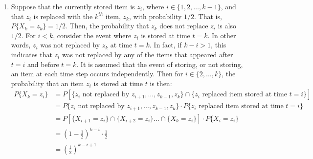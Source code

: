 \documentclass[twoside,11pt]{homework}
\begin{document}
\begin{enumerate}[\bf (a)]
\begin{proof}
Now,  consider the event where any other item $z_i \neq z_{k+1}$ is stored at time $t=k+1$. This is equivalent to the event where item $z_i$ is not replaced with $z_{k+1}$ AND $z_i$ being stored at time $t$. That is, 
\begin{align*}
P \left\lbrace X_{k+1} = z_i ,  \forall i \in \{1, \dots,k\} \right\rbrace & = 
P \left[ \left\lbrace z_i \text{  not replaced with } z_{k+1} \right\rbrace \cap  \left\lbrace z_i \text{ stored at time } t=k  \right\rbrace \right] \\[0.4em] 
& = P \left[ \left\lbrace X_{k+1} = z_i; \ i\neq k+1 \right\rbrace \cap  \left\lbrace X_k = z_i  \right\rbrace \right] \\[0.4em] 
& = P \left\lbrace X_{k+1} = z_i; \ i\neq k+1 \right\rbrace \cdot P \left\lbrace X_k = z_i  \right\rbrace \\[0.4em]
&= \left(1 - \frac{1}{k+1}\right) \cdot \frac{1}{k} \\[0.4em]
&= \frac{k}{k+1} \cdot \frac{1}{k} \\[0.4em]
& = \frac{1}{k+1}
\end{align*}
Therefore, the algorithm ensures that all items are stored with equal probability. 
\end{proof}
\item Suppose that the currently stored item is $z_i$,  where $i \in \{1, 2, \dots, k-1\}$, and that $z_i$ is replaced with the $k^{th}$ item, $z_k$, with probability $1/2$.  That is, $P\{X_k = z_k\} = 1/2$.  Then, the probability that $z_k$ does not replace $z_i$ is also $1/2$.  For $i < k$,  consider the event where $z_i$ is stored at time $t = k$. In other words,  $z_i$ was not replaced by $z_k$ at time $t=k$.  In fact, if $k-i > 1$, this indicates that $z_i$ was not replaced by any of the items that appeared after $t=i$ and before $t=k$.  It is assumed that the event of storing, or not storing, an item at each time step occurs independently.  Then for $i \in \{2, \dots, k\}$, the probability that an item $z_i$ is stored at time $t$ is then:
\begin{align*}
P\{X_k = z_i\} &= P\left[\{z_i \text{ not replaced by } z_{i+1}, \dots, z_{k-1}, z_k\} \cap \{z_i \text{ replaced item stored at time } t=i\}\right] \\[0.5em]
& = P\{z_i \text{ not replaced by } z_{i+1}, \dots, z_{k-1}, z_k\} \cdot P\{z_i \text{ replaced item stored at time } t=i\} \\[0.4em]
& = P\left[\{X_{i+1} = z_i \} \cap \{X_{i+2} = z_i \} \dots \cap \{ X_k = z_i\} \right] \cdot P\{X_i = z_i \} \\[0.4em]
&= \left(1 - \frac{1}{2}\right)^{k-i} \cdot \frac{1}{2} \\[0.4em]
& = \left( \frac{1}{2} \right)^{k-i+1}
\end{align*}


\end{enumerate}
\end{document}
